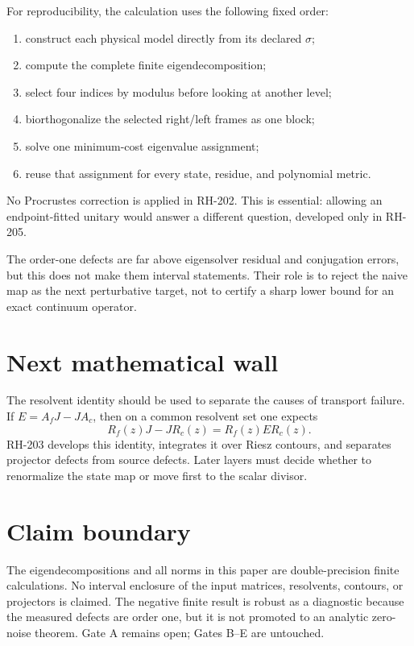 \documentclass[12pt]{article}
\theoremstyle{remark}
\begin{document}
For reproducibility, the calculation uses the following fixed order:
\begin{enumerate}[leftmargin=2em]
\item construct each physical model directly from its declared $\sigma$;
\item compute the complete finite eigendecomposition;
\item select four indices by modulus before looking at another level;
\item biorthogonalize the selected right/left frames as one block;
\item solve one minimum-cost eigenvalue assignment;
\item reuse that assignment for every state, residue, and polynomial metric.
\end{enumerate}
No Procrustes correction is applied in RH-202.  This is essential: allowing
an endpoint-fitted unitary would answer a different question, developed only
in RH-205.

The order-one defects are far above eigensolver residual and conjugation
errors, but this does not make them interval statements.  Their role is to
reject the naive map as the next perturbative target, not to certify a sharp
lower bound for an exact continuum operator.

\section{Next mathematical wall}

The resolvent identity should be used to separate the causes of transport
failure.  If $E=A_fJ-JA_c$, then on a common resolvent set one expects
\begin{equation*}
 R_f(z)J-JR_c(z)=R_f(z)ER_c(z).
\end{equation*}
RH-203 develops this identity, integrates it over Riesz contours, and
separates projector defects from source defects.  Later layers must decide
whether to renormalize the state map or move first to the scalar divisor.

\section{Claim boundary}

The eigendecompositions and all norms in this paper are double-precision
finite calculations.  No interval enclosure of the input matrices,
resolvents, contours, or projectors is claimed.  The negative finite result
is robust as a diagnostic because the measured defects are order one, but
it is not promoted to an analytic zero-noise theorem.  Gate A remains open;
Gates B--E are untouched.



\end{document}
